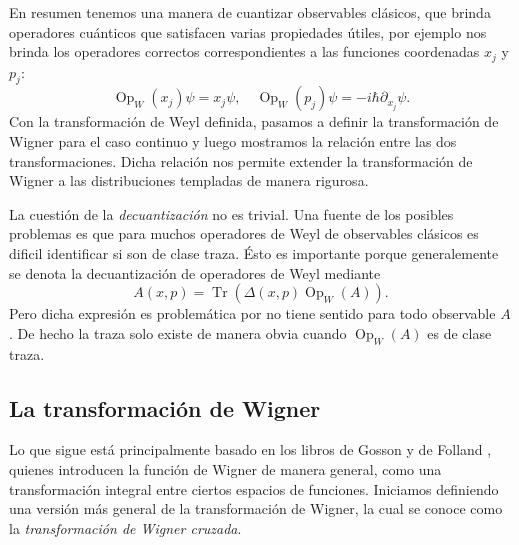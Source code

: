 \documentclass[a4paper]{report}
\DeclareMathOperator{\Tr}{Tr}
\DeclareMathOperator{\Op}{Op}
\begin{document}
  En resumen tenemos una manera de cuantizar observables
  clásicos, que brinda operadores cuánticos que satisfacen
  varias propiedades útiles, por ejemplo nos brinda los
  operadores correctos correspondientes a las funciones
  coordenadas
  $x_j$ y $p_j$:
  \begin{equation}
    \Op_W(x_j)\psi = x_j\psi,
    \quad
    \Op_W(p_j)\psi = -i\hbar \partial_{x_j}\psi.
  \end{equation}
  Con la transformación de Weyl definida, pasamos a definir
  la transformación de Wigner para el caso continuo y luego
  mostramos la relación entre las dos transformaciones.
  Dicha relación nos permite extender la transformación de
  Wigner a las distribuciones templadas de manera rigurosa.

  La cuestión de la \textit{decuantización} no es trivial.
  Una fuente de los posibles problemas es que para muchos
  operadores de Weyl de observables clásicos es dificil
  identificar si son de clase traza. Ésto es importante
  porque generalemente se denota la decuantización de
  operadores de Weyl mediante
  \[
    A(x,p)
    = \Tr\left( \Delta(x,p) \Op_W(A) \right). 
  \] 
  Pero dicha expresión es problemática por no tiene sentido
  para todo observable $A$. De hecho la traza solo existe de
  manera obvia cuando $\Op_W(A)$ es de clase traza.

  \subsection{La transformación de Wigner}

  Lo que sigue está principalmente basado en los libros de
  Gosson \cite{gossonWignerTransform2017} y de Folland
  \cite{follandHarmonicAnalysisPhase1989}, quienes
  introducen la función de Wigner de manera general, como
  una transformación integral entre ciertos espacios de
  funciones. Iniciamos definiendo una versión más general de
  la transformación de Wigner, la cual se conoce como la
  \textit{transformación de Wigner cruzada}. 
\end{document}
